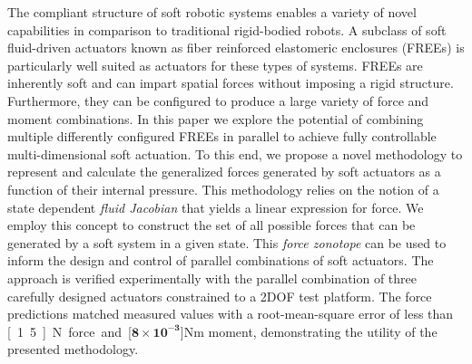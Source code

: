 The compliant structure of soft robotic systems enables a variety of novel capabilities in comparison to traditional rigid-bodied robots.
A subclass of soft fluid-driven actuators known as fiber reinforced elastomeric enclosures (FREEs) is particularly well suited as actuators for these types of systems.
FREEs are inherently soft and can impart spatial forces without imposing a rigid structure.
Furthermore, they can be configured to produce a large variety of force and moment combinations.
In this paper we explore the potential of combining multiple differently configured FREEs in parallel to achieve fully controllable multi-dimensional soft actuation.
To this end, we propose a novel methodology to represent and calculate the generalized forces generated by soft actuators as a function of their internal pressure.
This methodology relies on the notion of a state dependent \emph{fluid Jacobian} that yields a linear expression for force. We employ this concept to construct the set of all possible forces that can be generated by a soft system in a given state.
This \emph{force zonotope} can be used to inform the design and control of parallel combinations of soft actuators.  
The approach is verified experimentally with the parallel combination of three carefully designed actuators constrained to a 2DOF test platform.
The force predictions matched measured values with a root-mean-square error of less than \unit[1.5]{N} force and \unit[$\mathbf{8 \times 10^{-3}}$]{Nm} moment, demonstrating the utility of the presented methodology.  









